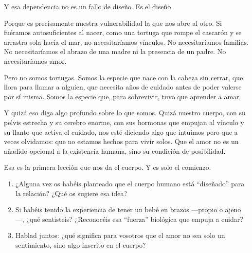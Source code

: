 Y esa dependencia no es un fallo de diseño. Es el diseño.

Porque es precisamente nuestra vulnerabilidad la que nos abre al otro. Si fuéramos autosuficientes al nacer, como una tortuga que rompe el cascarón y se arrastra sola hacia el mar, no necesitaríamos vínculos. No necesitaríamos familias. No necesitaríamos el abrazo de una madre ni la presencia de un padre. No necesitaríamos amor.

Pero no somos tortugas. Somos la especie que nace con la cabeza sin cerrar, que llora para llamar a alguien, que necesita años de cuidado antes de poder valerse por sí misma. Somos la especie que, para sobrevivir, tuvo que aprender a amar.

Y quizá eso diga algo profundo sobre lo que somos. Quizá nuestro cuerpo, con su pelvis estrecha y su cerebro enorme, con sus hormonas que empujan al vínculo y su llanto que activa el cuidado, nos esté diciendo algo que intuimos pero que a veces olvidamos: que no estamos hechos para vivir solos. Que el amor no es un añadido opcional a la existencia humana, sino su condición de posibilidad.

Esa es la primera lección que nos da el cuerpo. Y es solo el comienzo.

\paracaminar

\begin{enumerate}
  \item ¿Alguna vez os habéis planteado que el cuerpo humano está ``diseñado'' para la relación? ¿Qué os sugiere esa idea?

  \item Si habéis tenido la experiencia de tener un bebé en brazos ---propio o ajeno---, ¿qué sentisteis? ¿Reconocéis esa ``fuerza'' biológica que empuja a cuidar?

  \item Hablad juntos: ¿qué significa para vosotros que el amor no sea solo un sentimiento, sino algo inscrito en el cuerpo?
\end{enumerate}

